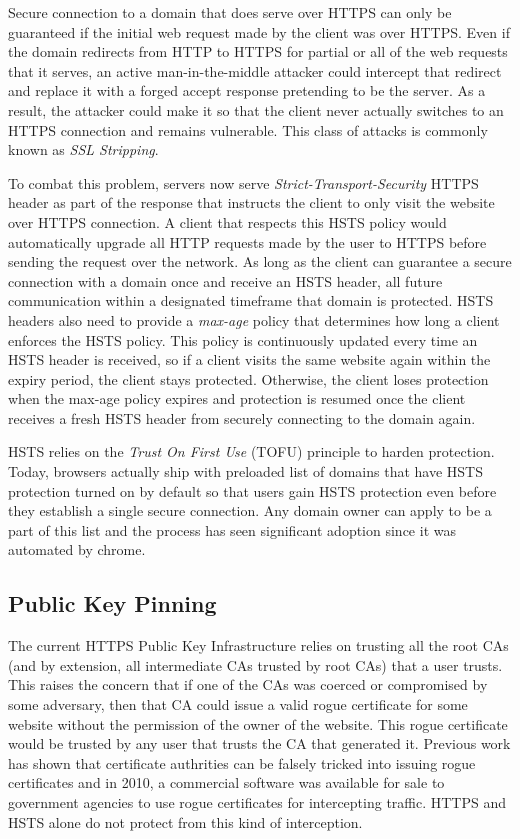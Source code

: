 Secure connection to a domain that does serve over HTTPS can only be guaranteed
if the initial web request made by the client was over HTTPS. Even if the
domain redirects from HTTP to HTTPS for partial or all of the web requests
that it serves, an active man-in-the-middle attacker could intercept that
redirect and replace it with a forged accept response pretending to be the
server. As a result, the attacker could make it so that the client never
actually switches to an HTTPS connection and remains vulnerable. This class of
attacks is commonly known as \emph{SSL Stripping}.

To combat this problem, servers now serve \emph{Strict-Transport-Security}
HTTPS header as part of the response that instructs the client to only visit
the website over HTTPS connection. A client that respects this HSTS policy
would automatically upgrade all HTTP requests made by the user to HTTPS before
sending the request over the network. As long as the client can guarantee a
secure connection with a domain once and receive an HSTS header, all future
communication within a designated timeframe that domain is protected. HSTS
headers also need to provide a \emph{max-age} policy that determines how long
a client enforces the HSTS policy. This policy is continuously updated every
time an HSTS header is received, so if a client visits the same website again
within the expiry period, the client stays protected. Otherwise, the client
loses protection when the max-age policy expires and protection is resumed once
the client receives a fresh HSTS header from securely connecting to the domain
again.

HSTS relies on the \emph{Trust On First Use} (TOFU) principle to harden
protection. Today, browsers actually ship with preloaded list of domains that
have HSTS protection turned on by default so that users gain HSTS protection
even before they establish a single secure connection. Any domain owner can
apply to be a part of this list and the process has seen significant adoption
since it was automated by chrome.


\subsection{Public Key Pinning}
The current HTTPS Public Key Infrastructure relies on trusting all the root CAs
(and by extension, all intermediate CAs trusted by root CAs) that a user
trusts. This raises the concern that if one of the CAs was coerced or
compromised by some adversary, then that CA could issue a valid rogue
certificate for some website without the permission of the owner of the
website. This rogue certificate would be trusted by any user that trusts the CA
that generated it. Previous work has shown that certificate authrities can be
falsely tricked into issuing rogue certificates and in 2010, a commercial
software was available for sale to government agencies to use rogue
certificates for intercepting traffic. HTTPS and HSTS alone do not protect from
this kind of interception.

